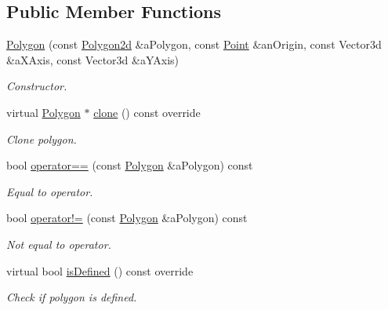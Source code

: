 \subsection*{Public Member Functions}
\begin{DoxyCompactItemize}
\item 
\hyperlink{classostk_1_1math_1_1geom_1_1d3_1_1objects_1_1_polygon_a35918431f15eeac44436e0d39c949dd7}{Polygon} (const \hyperlink{namespaceostk_1_1math_1_1geom_1_1d3_1_1objects_ab51647b491a750a403dcaca4c2254905}{Polygon2d} \&a\+Polygon, const \hyperlink{classostk_1_1math_1_1geom_1_1d3_1_1objects_1_1_point}{Point} \&an\+Origin, const Vector3d \&a\+X\+Axis, const Vector3d \&a\+Y\+Axis)
\begin{DoxyCompactList}\small\item\em Constructor. \end{DoxyCompactList}\item 
virtual \hyperlink{classostk_1_1math_1_1geom_1_1d3_1_1objects_1_1_polygon}{Polygon} $\ast$ \hyperlink{classostk_1_1math_1_1geom_1_1d3_1_1objects_1_1_polygon_a20f5870ed64f26d0f8e77040ececb60a}{clone} () const override
\begin{DoxyCompactList}\small\item\em Clone polygon. \end{DoxyCompactList}\item 
bool \hyperlink{classostk_1_1math_1_1geom_1_1d3_1_1objects_1_1_polygon_aaf7f2adc05d3847d6624a1fd4f2bd139}{operator==} (const \hyperlink{classostk_1_1math_1_1geom_1_1d3_1_1objects_1_1_polygon}{Polygon} \&a\+Polygon) const
\begin{DoxyCompactList}\small\item\em Equal to operator. \end{DoxyCompactList}\item 
bool \hyperlink{classostk_1_1math_1_1geom_1_1d3_1_1objects_1_1_polygon_ab881d8e438cb012d49c1f61aa4531c7a}{operator!=} (const \hyperlink{classostk_1_1math_1_1geom_1_1d3_1_1objects_1_1_polygon}{Polygon} \&a\+Polygon) const
\begin{DoxyCompactList}\small\item\em Not equal to operator. \end{DoxyCompactList}\item 
virtual bool \hyperlink{classostk_1_1math_1_1geom_1_1d3_1_1objects_1_1_polygon_ae136a158ff098477abe6f8c61f37bea6}{is\+Defined} () const override
\begin{DoxyCompactList}\small\item\em Check if polygon is defined. \end{DoxyCompactList}\item 

\end{DoxyCompactItemize}
